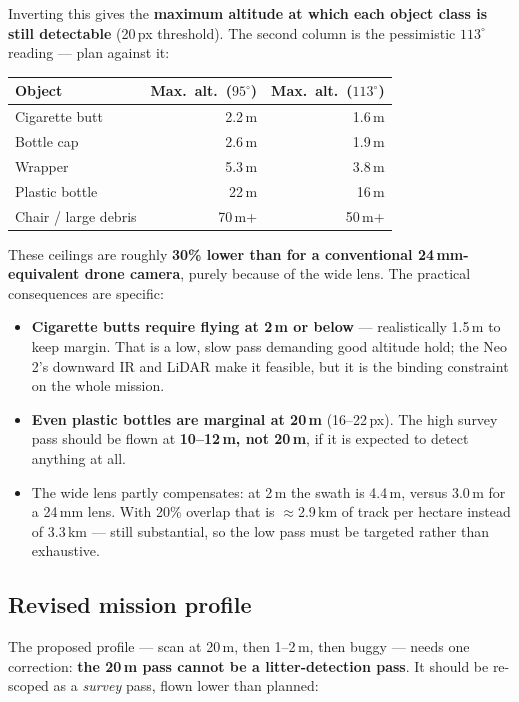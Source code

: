 \documentclass[11pt,a4paper]{article}
\newcommand{\gap}[1]{\textcolor{warn}{\textbf{#1}}}
\begin{document}
\noindent Inverting this gives the \textbf{maximum altitude at which each object
class is still detectable} (20\,px threshold). The second column is the
pessimistic $113^\circ$ reading --- plan against it:

\begin{center}
\begin{tabular}{lrr}
\toprule
\textbf{Object} & \textbf{Max.\ alt.\ ($95^\circ$)} & \textbf{Max.\ alt.\ ($113^\circ$)} \\
\midrule
Cigarette butt & 2.2\,m & 1.6\,m \\
Bottle cap     & 2.6\,m & 1.9\,m \\
Wrapper        & 5.3\,m & 3.8\,m \\
Plastic bottle & 22\,m  & 16\,m \\
Chair / large debris & 70\,m+ & 50\,m+ \\
\bottomrule
\end{tabular}
\end{center}

\noindent These ceilings are roughly \textbf{30\% lower than for a conventional
24\,mm-equivalent drone camera}, purely because of the wide lens. The practical
consequences are specific:

\begin{itemize}[leftmargin=*,itemsep=2pt]
\item \gap{Cigarette butts require flying at 2\,m or below} --- realistically
1.5\,m to keep margin. That is a low, slow pass demanding good altitude hold;
the Neo 2's downward IR and LiDAR make it feasible, but it is the binding
constraint on the whole mission.
\item \gap{Even plastic bottles are marginal at 20\,m} (16--22\,px). The high
survey pass should be flown at \textbf{10--12\,m, not 20\,m}, if it is expected
to detect anything at all.
\item The wide lens partly compensates: at 2\,m the swath is 4.4\,m, versus
3.0\,m for a 24\,mm lens. With 20\% overlap that is $\approx$2.9\,km of track per
hectare instead of 3.3\,km --- still substantial, so the low pass must be
targeted rather than exhaustive.
\end{itemize}

\subsection*{Revised mission profile}

The proposed profile --- scan at 20\,m, then 1--2\,m, then buggy --- needs one
correction: \textbf{the 20\,m pass cannot be a litter-detection pass}. It should
be re-scoped as a \emph{survey} pass, flown lower than planned:
\end{document}
